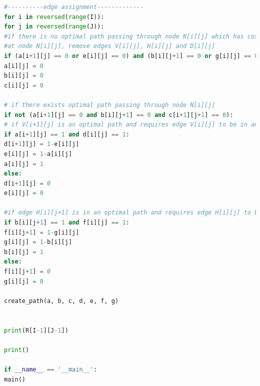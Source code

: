 \documentclass{article}
\begin{document}
\begin{lstlisting}[language=python]
#----------edge assignment-------------
for i in reversed(range(I)):
for j in reversed(range(J)):
#if there is no optimal path passing through node N[i][j] which has cost R[i][j]
#at node N[i][j], remove edges V[i][j], H[i][j] and D[i][j]
if (a[i+1][j] == 0 or e[i][j] == 0) and (b[i][j+1] == 0 or g[i][j] == 0) and (c[i+1][j+1] == 0):
a[i][j] = 0
b[i][j] = 0
c[i][j] = 0

# if there exists optimal path passing through node N[i][j]
if not (a[i+1][j] == 0 and b[i][j+1] == 0 and c[i+1][j+1] == 0):
# if V[i+1][j] is an optimal path and requires edge V[i][j] to be in an optimal path, determine if an optimal path that uses edge V[i+1][j] must use edge V[i][j] and the converse:
if a[i+1][j] == 1 and d[i][j] == 1:
d[i+1][j] = 1-e[i][j]
e[i][j] = 1-a[i][j]
a[i][j] = 1
else:
d[i+1][j] = 0
e[i][j] = 0

#if edge H[i][j+1] is in an optimal path and requires edge H[i][j] to be in an optimal path, determine if an optimal path that uses edge H[i][j+1] must use edge H[i][j] and the converse:
if b[i][j+1] == 1 and f[i][j] == 1:
f[i][j+1] = 1-g[i][j]
g[i][j] = 1-b[i][j]
b[i][j] = 1
else:
f[i][j+1] = 0
g[i][j] = 0

create_path(a, b, c, d, e, f, g)


print(R[I-1][J-1])

print()

if __name__ == '__main__':
main()
	\end{lstlisting}
	
\end{document}
